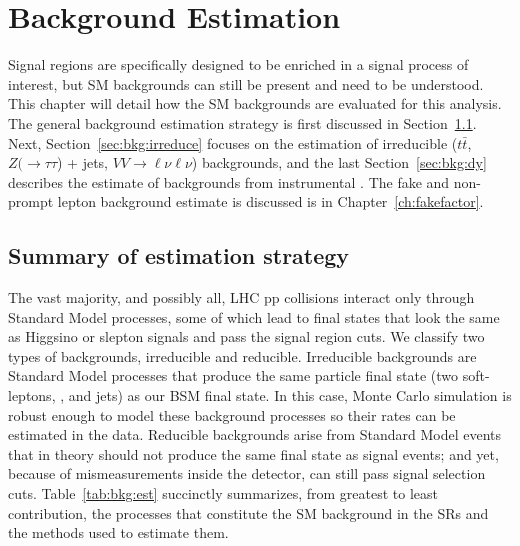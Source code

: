 \chapter{Background Estimation}
\label{ch:bkg}
Signal regions are specifically designed to be enriched in a signal process of interest, but SM backgrounds can still be present and need to be understood.  This chapter will detail how the SM backgrounds are evaluated for this analysis.  The general background estimation strategy is first discussed in Section~\ref{sec:bkg:summary}.  Next, Section~\ref{sec:bkg:irreduce} focuses on the estimation of irreducible ($t\bar{t}$, $Z(\rightarrow\tau\tau$) + jets, $VV\rightarrow\ell\nu\ell\nu$) backgrounds, and the last Section~\ref{sec:bkg:dy} describes the estimate of backgrounds from instrumental \met. The fake and non-prompt lepton background estimate is discussed is in Chapter~\ref{ch:fakefactor}.

\section{Summary of estimation strategy}
\label{sec:bkg:summary}
The vast majority, and possibly all, LHC pp collisions interact only through Standard Model processes, some of which lead to final states that look the same as Higgsino or slepton signals and pass the signal region cuts.  We classify two types of backgrounds, irreducible and reducible. Irreducible backgrounds are Standard Model processes that produce the same particle final state (two soft-leptons, \met, and jets) as our BSM final state.  In this case, Monte Carlo simulation is robust enough to model these background processes so their rates can be estimated in the data.  Reducible backgrounds arise from Standard Model events that in theory should not produce the same final state as signal events; and yet, because of mismeasurements inside the detector, can still pass signal selection cuts.  Table~\ref{tab:bkg:est} succinctly summarizes, from greatest to least contribution, the processes that constitute the SM background in the SRs and the methods used to estimate them. 

